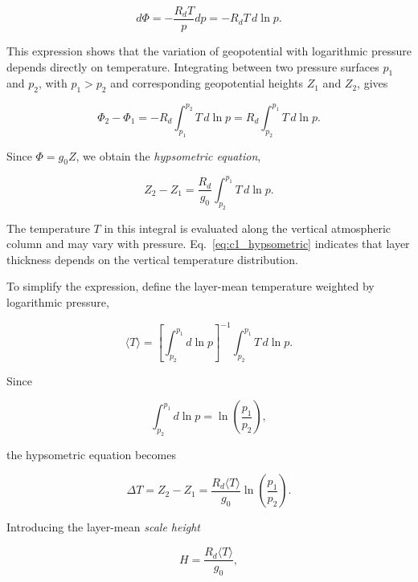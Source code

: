 \documentclass[10pt,twocolumn]{memoir}
\begin{document}
\begin{equation}
    d\Phi=-\frac{R_dT}{p}dp=-R_dT\,d\ln p.
\label{eq:c1_hydrostatic_geopotential}
\end{equation}

This expression shows that the variation of geopotential with logarithmic pressure depends directly on temperature. Integrating between two pressure surfaces $p_1$ and $p_2$, with $p_1>p_2$ and corresponding geopotential heights $Z_1$ and $Z_2$, gives

\begin{equation}
    \Phi_2-\Phi_1 = -R_d\int_{p_1}^{p_2}T\,d\ln p = R_d\int_{p_2}^{p_1}T\,d\ln p.
\end{equation}

Since $\Phi=g_0Z$, we obtain the \textit{hypsometric equation},

\begin{equation}
    Z_2-Z_1=\frac{R_d}{g_0}\int_{p_2}^{p_1}T\,d\ln p.
    \label{eq:c1_hypsometric}
\end{equation}

The temperature $T$ in this integral is evaluated along the vertical atmospheric column and may vary with pressure. Eq.~\ref{eq:c1_hypsometric} indicates that layer thickness depends on the vertical temperature distribution.

To simplify the expression, define the layer-mean temperature weighted by logarithmic pressure,

\begin{equation}
    \langle T\rangle = \left[\int_{p_2}^{p_1}d\ln p\right]^{-1} \int_{p_2}^{p_1}T\,d\ln p.
\end{equation}

Since

\begin{equation}
    \int_{p_2}^{p_1}d\ln p=\ln\left(\frac{p_1}{p_2}\right),
\end{equation}

the hypsometric equation becomes

\begin{equation}
    \Delta T = Z_2 - Z_1 = \frac{R_d\langle T\rangle}{g_0} \ln\left(\frac{p_1}{p_2}\right).
\label{eq:c1_hypsometric_mean_temperature}
\end{equation}

Introducing the layer-mean \textit{scale height}

\begin{equation}
    H=\frac{R_d\langle T\rangle}{g_0},
\end{equation}
\end{document}
